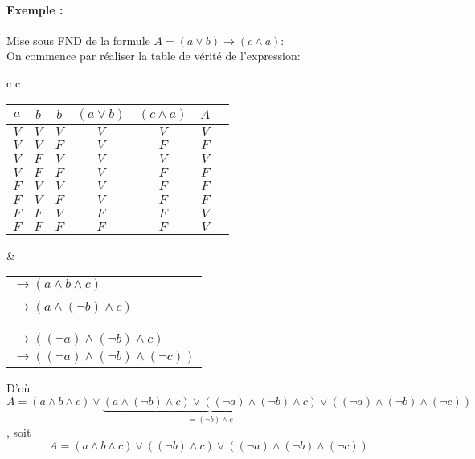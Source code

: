 \documentclass{scrartcl}
\newcommand{\exemple}[1]{\paragraph{Exemple : } #1\\}
\begin{document}
				\exemple{Mise sous FND de la formule $A = (a\vee b) \rightarrow (c \wedge a)$:}
					On commence par réaliser la table de vérité de l'expression:
					\begin{center}
					\begin{tabular}{c c}
					\begin{tabular}{| c c c | c | c | c | c }
						\hline
						$a$ & $b$ & $b$   &  $(a\vee b)$ & $(c \wedge a)$ & $A$ \\
						\hline
						$V$ & $V$ & $V$   &     $V$      &     $V$        & $V$ \\
						\hline
						$V$ & $V$ & $F$   &     $V$      &     $F$        & $F$ \\
						\hline
						$V$ & $F$ & $V$   &     $V$      &     $V$        & $V$ \\
						\hline
						$V$ & $F$ & $F$   &     $V$      &     $F$        & $F$ \\
						\hline
						$F$ & $V$ & $V$   &     $V$      &     $F$        & $F$ \\
						\hline
						$F$ & $V$ & $F$   &     $V$      &     $F$        & $F$ \\
						\hline
						$F$ & $F$ & $V$   &     $F$      &     $F$        & $V$ \\
						\hline
						$F$ & $F$ & $F$   &     $F$      &     $F$        & $V$ \\
						\hline
					\end{tabular}
					& \begin{tabular}{l}
					\\ $\rightarrow (a \wedge b \wedge c)$ \\ \\ 
					$\rightarrow (a \wedge (\neg b) \wedge c)$ \\ \\ \\ \\ 
					$\rightarrow ((\neg a) \wedge (\neg b) \wedge c)$ \\ 
					$\rightarrow ((\neg a) \wedge (\neg b) \wedge (\neg c))$ 
					\end{tabular}
					\end{tabular}
					\end{center}
					D'où $A = (a \wedge b \wedge c) \vee 
					\underbrace{(a \wedge (\neg b) \wedge c) \vee ((\neg a) \wedge (\neg b) \wedge c)}_{= (\neg b) \wedge c} 
					\vee ((\neg a) \wedge (\neg b) \wedge (\neg c))$, soit 
					\[ 
						\boxed{A = (a \wedge b \wedge c) \vee ((\neg b) \wedge c) \vee ((\neg a) \wedge (\neg b) \wedge (\neg c))}
					\]
\end{document}
